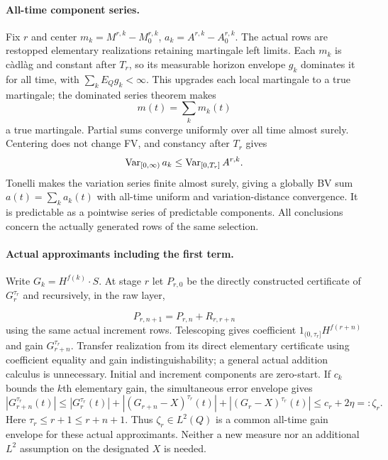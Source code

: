 \paragraph{All-time component series.}
Fix $r$ and center $m_k=M^{r,k}-M^{r,k}_0$, $a_k=A^{r,k}-A^{r,k}_0$.
The actual rows are restopped elementary realizations retaining martingale
left limits. Each $m_k$ is c\`adl\`ag and constant after $T_r$, so its
measurable horizon envelope $g_k$ dominates it for all time, with
$\sum_kE_Qg_k<\infty$.
This upgrades each local martingale to a true martingale; the dominated
series theorem makes
\[
 m(t)=\sum_km_k(t)
\]
 a true martingale.
Partial sums converge uniformly over all time almost surely.
Centering does not change FV, and constancy after $T_r$ gives
\[
 \operatorname{Var}_{[0,\infty)}a_k\leq\operatorname{Var}_{[0,T_r]}A^{r,k}.
\]
Tonelli makes the variation series finite almost surely, giving a globally
BV sum $a(t)=\sum_ka_k(t)$ with all-time uniform and variation-distance
convergence. It is predictable as a pointwise series of predictable components.
All conclusions concern the actually generated rows of the same selection.

\paragraph{Actual approximants including the first term.}
Write $G_k=H^{f(k)}\cdot S$. At stage $r$ let $P_{r,0}$ be the directly
constructed certificate of $G_r^{\tau_r}$ and recursively, in the raw layer,

\[
 P_{r,n+1}=P_{r,n}+R_{r,r+n}
\]
 using the same actual increment rows.
Telescoping gives coefficient $1_{(0,\tau_r]}H^{f(r+n)}$ and gain
$G_{r+n}^{\tau_r}$. Transfer realization from its direct elementary certificate
using coefficient equality and gain indistinguishability; a general actual
addition calculus is unnecessary. Initial and increment components are zero-start.
If $c_k$ bounds the $k$th elementary gain, the simultaneous error envelope gives
\[
 |G_{r+n}^{\tau_r}(t)|\leq |G_r^{\tau_r}(t)|
 +|(G_{r+n}-X)^{\tau_r}(t)|+|(G_r-X)^{\tau_r}(t)|
 \leq c_r+2\eta=:\zeta_r.
\]
Here $\tau_r\leq r+1\leq r+n+1$. Thus $\zeta_r\in L^2(Q)$ is a common
all-time gain envelope for these actual approximants. Neither a new measure
nor an additional $L^2$ assumption on the designated $X$ is needed.

